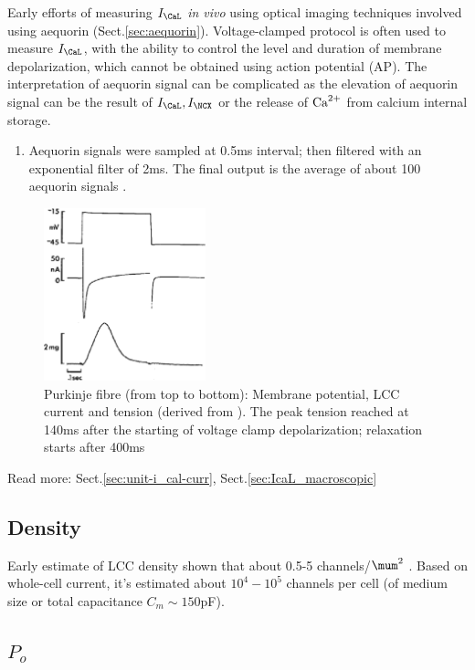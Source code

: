 Early efforts of measuring $I_\CaL$ {\it in vivo} using optical imaging
techniques involved using aequorin (Sect.\ref{sec:aequorin}). Voltage-clamped
protocol is often used to measure $I_\CaL$, with the ability to control the
level and duration of membrane depolarization, which cannot be obtained using
action potential (AP). The interpretation of aequorin signal can be complicated
as the elevation of aequorin signal can be the result of $I_\CaL, I_\NCX$ or the
release of ${\text{Ca}^{2+}}$ from calcium internal storage.

\begin{enumerate}
  \item Aequorin signals were sampled at 0.5ms interval; then filtered with an
  exponential filter of 2ms. The final output is the average of about 100
  aequorin signals \citep{wier1982}.
\end{enumerate}

\begin{figure}[hbt]
  \centerline{\includegraphics[height=5cm]{./images/LCC_current_Purkinje.eps}}
  \caption{Purkinje fibre (from top to bottom): Membrane potential, LCC current
  and tension (derived from \citep{wier1982}). The peak tension reached at 140ms after the
  starting of voltage clamp depolarization; relaxation starts after 400ms}
  \label{fig:LCC_current_Purkije_Wier82}
\end{figure}

Read more: Sect.\ref{sec:unit-i_cal-curr}, Sect.\ref{sec:IcaL_macroscopic}

\subsection{Density}

Early estimate of LCC density shown that about 0.5-5 channels/$\mum^2$
\citep{reuter1984}. Based on whole-cell current, it's estimated about
$10^4-10^5$ channels per cell (of medium size or total capacitance $C_m\sim
150$pF).

\subsection{$P_o$}

